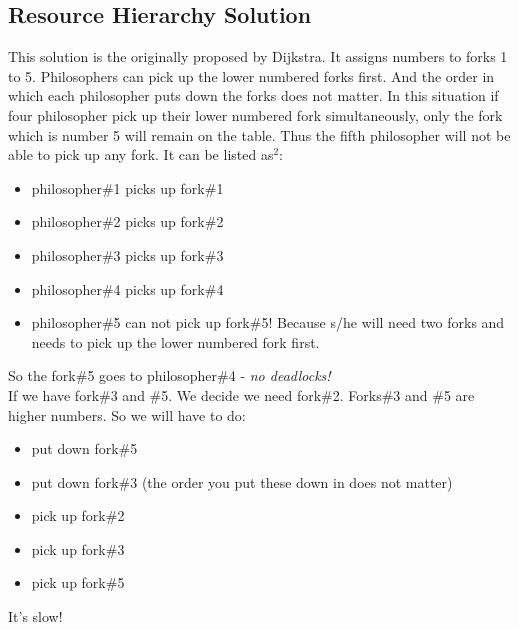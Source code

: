 \documentclass[12pt]{article}
\begin{document}
 \subsection*{Resource Hierarchy Solution}
 \begin{flushleft}
  This solution is the originally proposed by Dijkstra. It assigns numbers to forks 1 to 5. Philosophers can pick up the 
  lower numbered forks first. And the order in which each philosopher puts down the forks does not matter. In this situation 
  if four philosopher pick up their lower numbered fork simultaneously, only the fork which is number 5 will remain on the 
  table. Thus the fifth philosopher will not be able to pick up any fork. It can be listed as$^2$:
  \begin{itemize}
   \item philosopher\#1 picks up fork\#1
   \item philosopher\#2 picks up fork\#2
   \item philosopher\#3 picks up fork\#3
   \item philosopher\#4 picks up fork\#4
   \item philosopher\#5 can not pick up fork\#5! Because s/he will need two forks and needs to pick up the lower numbered 
   fork first.
  \end{itemize}
  So the fork\#5 goes to philosopher\#4 - \emph{no deadlocks!}\\
  If we have fork\#3 and \#5. We decide we need fork\#2. Forks\#3 and \#5 are higher numbers. So we will have to do:
  \begin{itemize}
   \item put down fork\#5
   \item put down fork\#3 (the order you put these down in does not matter)
   \item pick up fork\#2
   \item pick up fork\#3
   \item pick up fork\#5
  \end{itemize}
  It's slow!
 \end{flushleft}
 \pagebreak
\end{document}
